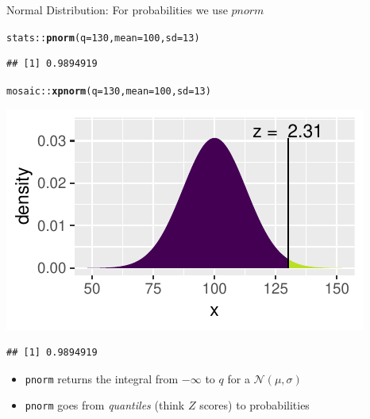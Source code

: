 \documentclass{beamer}\usepackage[]{graphicx}\usepackage[]{color}
\newcommand{\hlnum}[1]{\textcolor[rgb]{0.686,0.059,0.569}{#1}}%
\newcommand{\hlopt}[1]{\textcolor[rgb]{0,0,0}{#1}}%
\newcommand{\hlstd}[1]{\textcolor[rgb]{0.345,0.345,0.345}{#1}}%
\newcommand{\hlkwc}[1]{\textcolor[rgb]{0.333,0.667,0.333}{#1}}%
\newcommand{\hlkwd}[1]{\textcolor[rgb]{0.737,0.353,0.396}{\textbf{#1}}}%
\newenvironment{knitrout}{}{} %
\begin{document}
\begin{frame}[fragile]{Normal Distribution: For probabilities we use $pnorm$}


\begin{knitrout}\scriptsize
{}\color{fgcolor}
\begin{alltt}
\hlstd{stats}\hlopt{::}\hlkwd{pnorm}\hlstd{(}\hlkwc{q} \hlstd{=} \hlnum{130}\hlstd{,} \hlkwc{mean} \hlstd{=} \hlnum{100}\hlstd{,} \hlkwc{sd} \hlstd{=} \hlnum{13}\hlstd{)}
\end{alltt}
\begin{verbatim}
## [1] 0.9894919
\end{verbatim}

\end{knitrout}


\begin{knitrout}\scriptsize
{}\color{fgcolor}
\begin{alltt}
\hlstd{mosaic}\hlopt{::}\hlkwd{xpnorm}\hlstd{(}\hlkwc{q} \hlstd{=} \hlnum{130}\hlstd{,} \hlkwc{mean} \hlstd{=} \hlnum{100}\hlstd{,} \hlkwc{sd} \hlstd{=} \hlnum{13}\hlstd{)}
\end{alltt}


{\centering \includegraphics[width=0.6\linewidth]{figure/probs3-1} 

}


\begin{verbatim}
## [1] 0.9894919
\end{verbatim}

\end{knitrout}


\begin{itemize}
	\item \texttt{pnorm} returns the integral from $-\infty$ to $q$ for a $\mathcal{N}(\mu, \sigma)$
	\item \texttt{pnorm} goes from \textit{quantiles} (think $Z$ scores) to probabilities
\end{itemize}

\end{frame}
\end{document}
